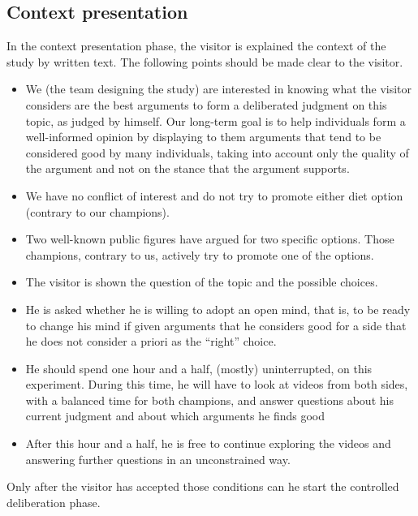 \documentclass[version=3.21, pagesize, twoside=off, bibliography=totoc, DIV=calc, fontsize=12pt, a4paper]{scrartcl}
\begin{document}
\subsection{Context presentation}
In the context presentation phase, the visitor is explained the context of the study by written text. The following points should be made clear to the visitor.
\begin{itemize}
	\item We (the team designing the study) are interested in knowing what the visitor considers are the best arguments to form a deliberated judgment on this topic, as judged by himself. Our long-term goal is to help individuals form a well-informed opinion by displaying to them arguments that tend to be considered good by many individuals, taking into account only the quality of the argument and not on the stance that the argument supports.
	\item We have no conflict of interest and do not try to promote either diet option (contrary to our champions). 
	\item Two well-known public figures have argued for two specific options. Those champions, contrary to us, actively try to promote one of the options.
	\item The visitor is shown the question of the topic and the possible choices.
	\item He is asked whether he is willing to adopt an open mind, that is, to be ready to change his mind if given arguments that he considers good for a side that he does not consider a priori as the “right” choice. 
	\item He should spend one hour and a half, (mostly) uninterrupted, on this experiment. During this time, he will have to look at videos from both sides, with a balanced time for both champions, and answer questions about his current judgment and about which arguments he finds good   
	\item After this hour and a half, he is free to continue exploring the videos and answering further questions in an unconstrained way.
\end{itemize}
Only after the visitor has accepted those conditions can he start the controlled deliberation phase. 
\end{document}
